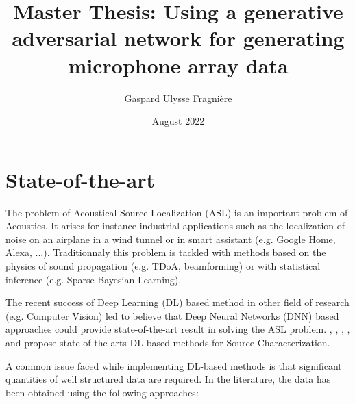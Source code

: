\documentclass{article}
\title{Master Thesis: Using a generative adversarial network for generating microphone array data}
\author{Gaspard Ulysse Fragnière}
\date{August 2022}
\begin{document}
\maketitle


\section{State-of-the-art}

The problem of Acoustical Source Localization (ASL) is an important problem  of Acoustics. It arises for instance industrial applications such as the localization of noise on an airplane in a wind tunnel or in smart assistant (e.g. Google Home, Alexa, ...). Traditionnaly this problem is tackled with methods based on the physics of sound propagation (e.g. TDoA, beamforming) or with statistical inference (e.g. Sparse Bayesian Learning). 

The recent success of Deep Learning (DL) based method in other field of research (e.g. Computer Vision) led to believe that Deep Neural Networks (DNN) based approaches could provide state-of-the-art result in solving the ASL problem. \cite{castellini2021neural}, \cite{kujawski2019deep}, \cite{lee2021deep}, \cite{ma2019phased}, \cite{pinto2021deconvoluting} and \cite{xu2021deep} propose state-of-the-arts DL-based methods for Source Characterization. 


A common issue faced while implementing DL-based methods is that significant quantities of well structured data are required. In the literature, the data has been obtained using the following approaches:
\end{document}
